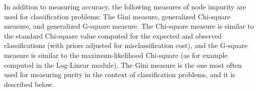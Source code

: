 In addition to measuring accuracy, the following measures of node impurity are used for classification problems: The Gini measure, generalized Chi-square measure, and generalized G-square measure. The Chi-square measure is similar to the standard Chi-square value computed for the expected and observed classifications (with priors adjusted for misclassification cost), and the G-square measure is similar to the maximum-likelihood Chi-square (as for example computed in the Log-Linear module). The Gini measure is the one most often used for measuring purity in the context of classification problems, and it is described below.


